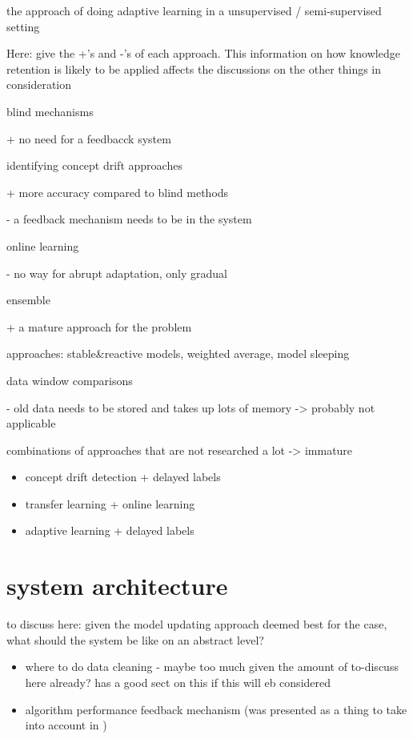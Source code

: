 the approach of doing adaptive learning in a unsupervised / semi-supervised setting

Here: give the +'s and -'s of each approach. This information on how knowledge retention is likely to be applied affects the discussions on the other things in consideration

blind mechanisms

+ no need for a feedbacck system

identifying concept drift approaches

+ more accuracy compared to blind methods \cite{conceptdriftsurvey}

- a feedback mechanism needs to be in the system

online learning

- no way for abrupt adaptation, only gradual \cite{conceptdriftsurvey}

ensemble

+ a mature approach for the problem \cite{mlforstreamingsurvey}

approaches: stable&reactive models, weighted average, model sleeping \cite{conceptdriftsurvey}

data window comparisons

- old data needs to be stored and takes up lots of memory \cite{conceptdriftsurvey} -> probably not applicable

combinations of approaches that are not researched a lot -> immature

\begin{itemize}
    \item concept drift detection + delayed labels \cite{mlforstreamingsurvey}
    \item transfer learning + online learning \cite{mlforstreamingsurvey}
    \item adaptive learning + delayed labels \cite{mlforstreamingsurvey}
\end{itemize}

\section{system architecture}

to discuss here: given the model updating approach deemed best for the case, what should the system be like on an abstract level?

\begin{itemize}
    \item where to do data cleaning - maybe too much given the amount of to-discuss here already? \cite{mlforstreamingsurvey} has a good sect on this if this will eb considered
    \item algorithm performance feedback mechanism (was presented as a thing to take into account in \cite{streamminingchallenges})
\end{itemize}

